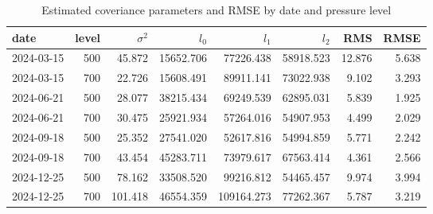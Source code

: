 \begin{table}
\caption{Estimated coveriance parameters and RMSE by date and pressure level}
\label{tab:params_rmse}
\begin{tabular}{lrrrrrrr}
\toprule
date & level & $\sigma^2$ & $l_0$ & $l_1$ & $l_2$ & RMS & RMSE \\
\midrule
2024-03-15 & 500 & 45.872 & 15652.706 & 77226.438 & 58918.523 & 12.876 & 5.638 \\
2024-03-15 & 700 & 22.726 & 15608.491 & 89911.141 & 73022.938 & 9.102 & 3.293 \\
2024-06-21 & 500 & 28.077 & 38215.434 & 69249.539 & 62895.031 & 5.839 & 1.925 \\
2024-06-21 & 700 & 30.475 & 25921.934 & 57264.016 & 54907.953 & 4.499 & 2.029 \\
2024-09-18 & 500 & 25.352 & 27541.020 & 52617.816 & 54994.859 & 5.771 & 2.242 \\
2024-09-18 & 700 & 43.454 & 45283.711 & 73979.617 & 67563.414 & 4.361 & 2.566 \\
2024-12-25 & 500 & 78.162 & 33508.520 & 99216.812 & 54465.457 & 9.974 & 3.994 \\
2024-12-25 & 700 & 101.418 & 46554.359 & 109164.273 & 77262.367 & 5.787 & 3.219 \\
\bottomrule
\end{tabular}
\end{table}
